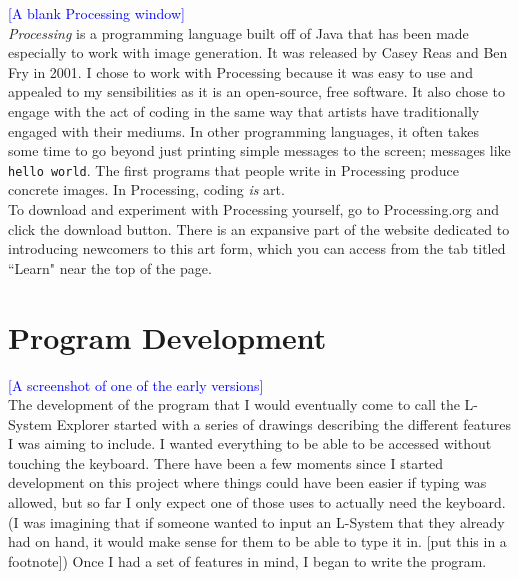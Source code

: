 \documentclass[12pt,twoside]{reedthesis}
\newcommand{\code}[1]{\texttt{#1}}
\begin{document}
	\textcolor{blue}{[A blank Processing window]}\\

	\textit{Processing} is a programming language built off of Java that has been made especially to work with image generation. It was released by Casey Reas and Ben Fry in 2001. I chose to work with Processing because it was easy to use and appealed to my sensibilities as it is an open-source, free software. It also chose to engage with the act of coding in the same way that artists have traditionally engaged with their mediums. In other programming languages, it often takes some time to go beyond just printing simple messages to the screen; messages like \code{hello world}. The first programs that people write in Processing produce concrete images. In Processing, coding \textit{is} art. \\
	
	To download and experiment with Processing yourself, go to Processing.org and click the download button. There is an expansive part of the website dedicated to introducing newcomers to this art form, which you can access from the tab titled ``Learn" near the top of the page.\\

\section{Program Development}

	\textcolor{blue}{[A screenshot of one of the early versions]}\\

	The development of the program that I would eventually come to call the L-System Explorer started with a series of drawings describing the different features I was aiming to include. I wanted everything to be able to be accessed without touching the keyboard. There have been a few moments since I started development on this project where things could have been easier if typing was allowed, but so far I only expect one of those uses to actually need the keyboard. (I was imagining that if someone wanted to input an L-System that they already had on hand, it would make sense for them to be able to type it in. [put this in a footnote]) Once I had a set of features in mind, I began to write the program.\\
	
\end{document}
